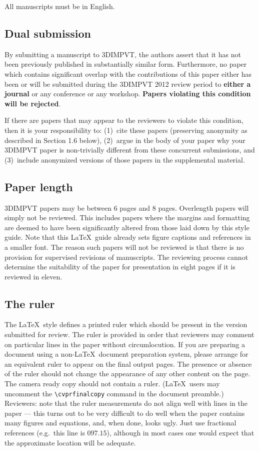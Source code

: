 \documentclass[10pt,twocolumn,letterpaper]{article}
\begin{document}
All manuscripts must be in English.

\subsection{Dual submission}

By submitting a manuscript to 3DIMPVT, the authors assert that it has
not been previously published in substantially similar
form. Furthermore, no paper which contains significant overlap with
the contributions of this paper either has been or will be submitted
during the 3DIMPVT 2012 review period to {\bf either a journal} or any
conference or any workshop.  {\bf Papers violating this condition will
  be rejected}.

If there are papers that may appear to the reviewers to violate this
condition, then it is your responsibility to: (1)~cite these papers
(preserving anonymity as described in Section 1.6 below), (2)~argue in
the body of your paper why your 3DIMPVT paper is non-trivially
different from these concurrent submissions, and (3)~include
anonymized versions of those papers in the supplemental material.

\subsection{Paper length}
3DIMPVT papers may be between 6 pages and 8 pages.  Overlength papers
will simply not be reviewed.  This includes papers where the margins
and formatting are deemed to have been significantly altered from
those laid down by this style guide.  Note that this \LaTeX\ guide
already sets figure captions and references in a smaller font.  The
reason such papers will not be reviewed is that there is no provision
for supervised revisions of manuscripts.  The reviewing process cannot
determine the suitability of the paper for presentation in eight pages
if it is reviewed in eleven.

\subsection{The ruler}
The \LaTeX\ style defines a printed ruler which should be present in
the version submitted for review.  The ruler is provided in order that
reviewers may comment on particular lines in the paper without
circumlocution.  If you are preparing a document using a non-\LaTeX\
document preparation system, please arrange for an equivalent ruler to
appear on the final output pages.  The presence or absence of the
ruler should not change the appearance of any other content on the
page.  The camera ready copy should not contain a ruler. (\LaTeX\
users may uncomment the \verb'\cvprfinalcopy' command in the document
preamble.)  Reviewers: note that the ruler measurements do not align
well with lines in the paper --- this turns out to be very difficult
to do well when the paper contains many figures and equations, and,
when done, looks ugly.  Just use fractional references (e.g.\ this
line is $097.15$), although in most cases one would expect that the
approximate location will be adequate.
\end{document}
